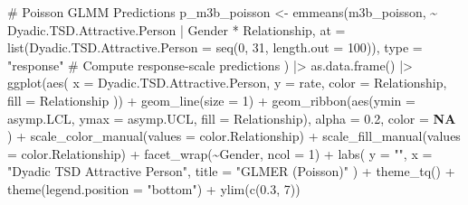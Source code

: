 \documentclass[
  bookmarksnumbered]{article}
\newenvironment{Shaded}{\begin{snugshade}}{\end{snugshade}}
\newcommand{\AttributeTok}[1]{\textcolor[rgb]{0.80,0.80,0.80}{#1}}
\newcommand{\CommentTok}[1]{\textcolor[rgb]{0.50,0.62,0.50}{#1}}
\newcommand{\ConstantTok}[1]{\textcolor[rgb]{0.86,0.64,0.64}{\textbf{#1}}}
\newcommand{\DecValTok}[1]{\textcolor[rgb]{0.86,0.86,0.80}{#1}}
\newcommand{\FloatTok}[1]{\textcolor[rgb]{0.75,0.75,0.82}{#1}}
\newcommand{\FunctionTok}[1]{\textcolor[rgb]{0.94,0.94,0.56}{#1}}
\newcommand{\NormalTok}[1]{\textcolor[rgb]{0.80,0.80,0.80}{#1}}
\newcommand{\OtherTok}[1]{\textcolor[rgb]{0.94,0.94,0.56}{#1}}
\newcommand{\SpecialCharTok}[1]{\textcolor[rgb]{0.86,0.64,0.64}{#1}}
\newcommand{\StringTok}[1]{\textcolor[rgb]{0.80,0.58,0.58}{#1}}
\begin{document}
\begin{Shaded}
\begin{Highlighting}[]
\CommentTok{\# Poisson GLMM Predictions}
\NormalTok{p\_m3b\_poisson }\OtherTok{\textless{}{-}} \FunctionTok{emmeans}\NormalTok{(m3b\_poisson, }\SpecialCharTok{\textasciitilde{}}\NormalTok{ Dyadic.TSD.Attractive.Person }\SpecialCharTok{|}\NormalTok{ Gender }\SpecialCharTok{*}\NormalTok{ Relationship,}
  \AttributeTok{at =} \FunctionTok{list}\NormalTok{(}\AttributeTok{Dyadic.TSD.Attractive.Person =} \FunctionTok{seq}\NormalTok{(}\DecValTok{0}\NormalTok{, }\DecValTok{31}\NormalTok{, }\AttributeTok{length.out =} \DecValTok{100}\NormalTok{)),}
  \AttributeTok{type =} \StringTok{"response"} \CommentTok{\# Compute response{-}scale predictions}
\NormalTok{) }\SpecialCharTok{|\textgreater{}}
  \FunctionTok{as.data.frame}\NormalTok{() }\SpecialCharTok{|\textgreater{}}
  \FunctionTok{ggplot}\NormalTok{(}\FunctionTok{aes}\NormalTok{(}
    \AttributeTok{x =}\NormalTok{ Dyadic.TSD.Attractive.Person, }\AttributeTok{y =}\NormalTok{ rate,}
    \AttributeTok{color =}\NormalTok{ Relationship, }\AttributeTok{fill =}\NormalTok{ Relationship}
\NormalTok{  )) }\SpecialCharTok{+}
  \FunctionTok{geom\_line}\NormalTok{(}\AttributeTok{size =} \DecValTok{1}\NormalTok{) }\SpecialCharTok{+}
  \FunctionTok{geom\_ribbon}\NormalTok{(}\FunctionTok{aes}\NormalTok{(}\AttributeTok{ymin =}\NormalTok{ asymp.LCL, }\AttributeTok{ymax =}\NormalTok{ asymp.UCL, }\AttributeTok{fill =}\NormalTok{ Relationship),}
    \AttributeTok{alpha =} \FloatTok{0.2}\NormalTok{, }\AttributeTok{color =} \ConstantTok{NA}
\NormalTok{  ) }\SpecialCharTok{+}
  \FunctionTok{scale\_color\_manual}\NormalTok{(}\AttributeTok{values =}\NormalTok{ color.Relationship) }\SpecialCharTok{+}
  \FunctionTok{scale\_fill\_manual}\NormalTok{(}\AttributeTok{values =}\NormalTok{ color.Relationship) }\SpecialCharTok{+}
  \FunctionTok{facet\_wrap}\NormalTok{(}\SpecialCharTok{\textasciitilde{}}\NormalTok{Gender, }\AttributeTok{ncol =} \DecValTok{1}\NormalTok{) }\SpecialCharTok{+}
  \FunctionTok{labs}\NormalTok{(}
    \AttributeTok{y =} \StringTok{""}\NormalTok{, }\AttributeTok{x =} \StringTok{"Dyadic TSD Attractive Person"}\NormalTok{,}
    \AttributeTok{title =} \StringTok{"GLMER (Poisson)"}
\NormalTok{  ) }\SpecialCharTok{+}
  \FunctionTok{theme\_tq}\NormalTok{() }\SpecialCharTok{+}
  \FunctionTok{theme}\NormalTok{(}\AttributeTok{legend.position =} \StringTok{"bottom"}\NormalTok{) }\SpecialCharTok{+}
  \FunctionTok{ylim}\NormalTok{(}\FunctionTok{c}\NormalTok{(}\FloatTok{0.3}\NormalTok{, }\DecValTok{7}\NormalTok{))}


\end{Highlighting}
\end{Shaded}
\end{document}
